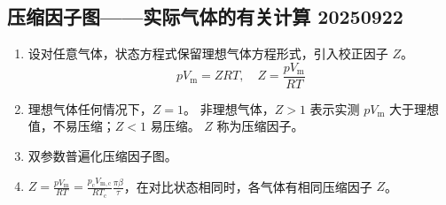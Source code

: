 \subsection{压缩因子图——实际气体的有关计算 20250922}

\begin{enumerate}
    \item 设对任意气体，状态方程式保留理想气体方程形式，引入校正因子 $Z$。
    \begin{equation}
        p V_{\mathrm{m}} = ZRT, \quad Z = \frac{p V_{\mathrm{m}}}{RT}
    \end{equation}
    \item 理想气体任何情况下，$Z = 1$。
    非理想气体，$Z > 1$ 表示实测 $p V_{\mathrm{m}}$ 大于理想值，不易压缩；$Z < 1$ 易压缩。 $Z$ 称为压缩因子。
    \item 双参数普遍化压缩因子图。
    \item $Z = \frac{p V_{\mathrm{m}}}{RT} = \frac{p_{\mathrm{c}} V_{\mathrm{m,c}}}{R T_{\mathrm{c}}} \frac{\pi \beta}{\tau}$，在对比状态相同时，各气体有相同压缩因子 $Z$。
\end{enumerate}